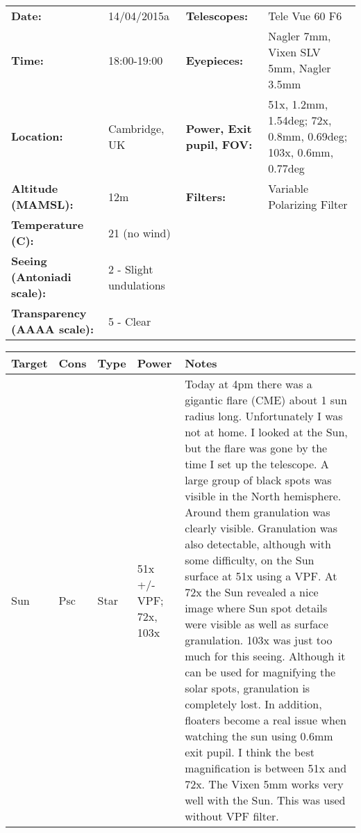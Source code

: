 \begin{tabular}{ p{1.7in} p{1.2in} p{1.5in} p{4.2in}}
{\bf Date:} & 14/04/2015a & {\bf Telescopes:} & Tele Vue 60 F6 \\ 
{\bf Time:} & 18:00-19:00 & {\bf Eyepieces:} & Nagler 7mm, Vixen SLV 5mm, Nagler 3.5mm \\ 
{\bf Location:} & Cambridge, UK & {\bf Power, Exit pupil, FOV:} & 51x, 1.2mm, 1.54deg; 72x, 0.8mm, 0.69deg; 103x, 0.6mm, 0.77deg \\ 
{\bf Altitude (MAMSL):} & 12m & {\bf Filters:} & Variable Polarizing Filter \\ 
{\bf Temperature (C):} & 21 (no wind) & & \\ 
{\bf Seeing (Antoniadi scale):} & 2 - Slight undulations & & \\ 
{\bf Transparency (AAAA scale):} & 5 - Clear & & \\ 
\end{tabular}
\centering 
\begin{longtable}{ p{0.8in}  p{0.3in}  p{0.5in}  p{0.9in}  p{5.8in} }
\hline 
{\bf Target} & {\bf Cons} & {\bf Type} & {\bf Power} & {\bf Notes} \\ 
\hline 
Sun & Psc & Star & 51x +/- VPF; 72x, 103x & Today at 4pm there was a gigantic flare (CME) about 1 sun radius long. Unfortunately I was not at home. I looked at the Sun, but the flare was gone by the time I set up the telescope. A large group of black spots was visible in the North hemisphere. Around them granulation was clearly visible. Granulation was also detectable, although with some difficulty, on the Sun surface at 51x using a VPF. At 72x the Sun revealed a nice image where Sun spot details were visible as well as surface granulation. 103x was just too much for this seeing. Although it can be used for magnifying the solar spots, granulation is completely lost. In addition, floaters become a real issue when watching the sun using 0.6mm exit pupil. I think the best magnification is between 51x and 72x. The Vixen 5mm works very well with the Sun. This was used without VPF filter. \\ 
\hline 
\end{longtable} 
